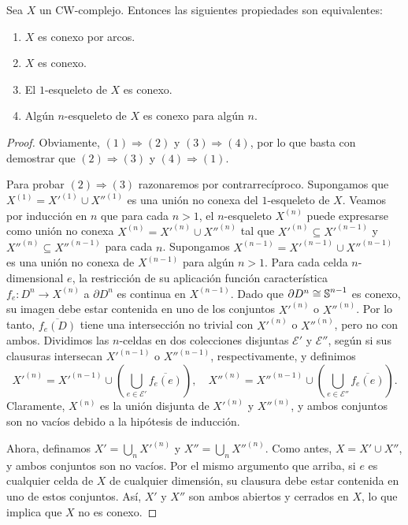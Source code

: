 \begin{teorema}
	\label{teo:cw-conexion} Sea $X$ un CW-complejo. Entonces las siguientes
	propiedades son equivalentes:
	\begin{enumerate}
		\item $X$ es conexo por arcos.
		
		\item $X$ es conexo.
		
		\item El $1$-esqueleto de $X$ es conexo.
		
		\item Algún $n$-esqueleto de $X$ es conexo para algún $n$.
	\end{enumerate}
\end{teorema}
\begin{proof}
	Obviamente, $(1) \Rightarrow (2)$ y $(3) \Rightarrow (4)$, por lo que basta con
	demostrar que $(2) \Rightarrow (3)$ y $(4) \Rightarrow (1)$.
	
	Para probar $(2) \Rightarrow (3)$ razonaremos por contrarrecíproco. Supongamos
	que $X^{(1)}= X'^{(1)}\cup X''^{(1)}$ es una unión no conexa del $1$-esqueleto
	de $X$. Veamos por inducción en $n$ que para cada $n > 1$, el $n$-esqueleto
	$X^{(n)}$ puede expresarse como unión no conexa
	$X^{(n)}= X'^{(n)}\cup X''^{(n)}$ tal que $X'^{(n)}\subseteq X'^{(n-1)}$ y
	$X''^{(n)}\subseteq X''^{(n-1)}$ para cada $n$. Supongamos $X^{(n-1)}= X'^{(n-1)}
	\cup X''^{(n-1)}$ es una unión no conexa de $X^{(n-1)}$ para algún $n > 1$.
	Para cada celda $n$-dimensional $e$, la restricción de su aplicación función característica
	$f_{e}\colon D^{n}\to X^{(n)}$ a $\partial D^{n}$ es continua en $X^{(n-1)}$.
	Dado que $\partial D^{n}\cong \operatorname{\mathbb{S}}^{n-1}$ es conexo, su imagen debe estar contenida
	en uno de los conjuntos $X'^{(n)}$ o $X''^{(n)}$. Por lo tanto, $\overline{f_e(D)}$
	tiene una intersección no trivial con $X'^{(n)}$ o $X''^{(n)}$, pero no con
	ambos. Dividimos las $n$-celdas en dos colecciones disjuntas $\mathcal{E}'$ y $\mathcal{E}
	''$, según si sus clausuras intersecan $X'^{(n-1)}$ o $X''^{(n-1)}$, respectivamente,
	y definimos
	\[
	X'^{(n)}= X'^{(n-1)}\cup \left(\bigcup_{e \in \mathcal{E}'}\overline{f_e(e)}\right
	),\quad X''^{(n)}= X''^{(n-1)}\cup \left(\bigcup_{e \in \mathcal{E}''}\overline
	{f_e(e)}\right).
	\]
	Claramente, $X^{(n)}$ es la unión disjunta de $X'^{(n)}$ y $X''^{(n)}$, y
	ambos conjuntos son no vacíos debido a la hipótesis de inducción.
	
	Ahora, definamos $X' = \bigcup_{n}X'^{(n)}$ y $X'' = \bigcup_{n}X''^{(n)}$.
	Como antes, $X = X' \cup X''$, y ambos conjuntos son no vacíos. Por el mismo argumento
	que arriba, si $e$ es cualquier celda de $X$ de cualquier dimensión, su clausura
	debe estar contenida en uno de estos conjuntos. Así, $X'$ y $X''$ son ambos abiertos
	y cerrados en $X$, lo que implica que $X$ no es conexo.
	

\end{proof}
